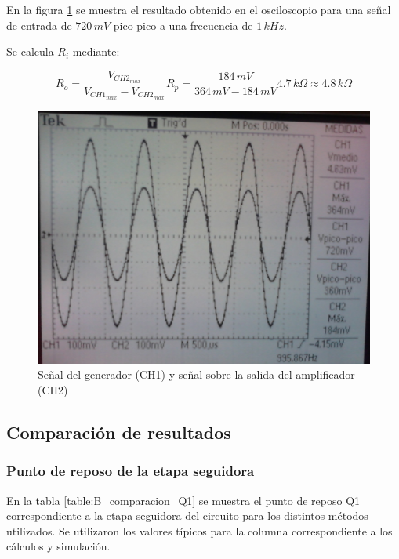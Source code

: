 \documentclass[10pt,spanish,a4paper,notitlepage]{article}
\begin{document}
En la figura \ref{fig:B_medicion_Ro} se muestra el resultado obtenido en el osciloscopio
para una señal de entrada de $720\,\unit{mV}$ pico-pico a una frecuencia de
$1\,\unit{kHz}$.

Se calcula $R_i$ mediante:

\[ \displaystyle R_o = \frac{V_{CH2_{max}}}{V_{CH1_{max}} - V_{CH2_{max}}} R_p = 
\frac{184\,\unit{mV}}{364\,\unit{mV} - 184\,\unit{mV}} 4.7\,\unit{k\Omega} \approx 
4.8\,\unit{k\Omega}\]

\begin{figure}[H]
\centering
\includegraphics[scale=0.12]{mediciones/3_acoplado_Ro.jpg}
\caption{Señal del generador (CH1) y señal sobre la salida del amplificador (CH2)}
\label{fig:B_medicion_Ro}
\end{figure}

\subsection{Comparación de resultados}

\subsubsection{Punto de reposo de la etapa seguidora}

En la tabla \ref{table:B_comparacion_Q1} se muestra el punto de reposo
Q1 correspondiente a la etapa seguidora del circuito para los distintos
métodos utilizados. Se utilizaron los valores típicos para la columna
correspondiente a los cálculos y simulación.
\end{document}
